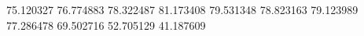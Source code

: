 75.120327
76.774883
78.322487
81.173408
79.531348
78.823163
79.123989
77.286478
69.502716
52.705129
41.187609
